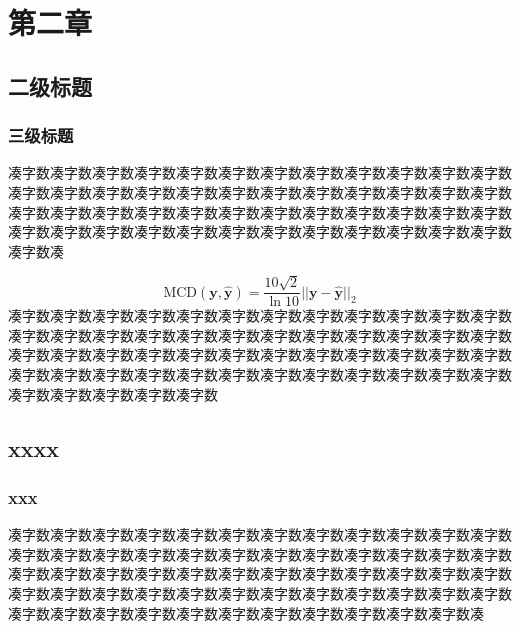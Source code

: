 \section{第二章}
\subsection{二级标题}
\subsubsection{三级标题}
凑字数凑字数凑字数凑字数凑字数凑字数凑字数凑字数凑字数凑字数凑字数凑字数凑字数凑字数凑字数凑字数凑字数凑字数凑字数凑字数凑字数凑字数凑字数凑字数凑字数凑字数凑字数凑字数凑字数凑字数凑字数凑字数凑字数凑字数凑字数凑字数凑字数凑字数凑字数凑字数凑字数凑字数凑字数凑字数凑字数凑字数凑字数凑字数凑字数凑\par
\begin{equation}
    \mathrm{MCD}(\boldsymbol{y},\boldsymbol{\hat{y}})=\frac{10\sqrt{2}}{\ln10}||\boldsymbol{y}-\boldsymbol{\hat{y}}||_2
\end{equation}
凑字数凑字数凑字数凑字数凑字数凑字数凑字数凑字数凑字数凑字数凑字数凑字数凑字数凑字数凑字数凑字数凑字数凑字数凑字数凑字数凑字数凑字数凑字数凑字数凑字数凑字数凑字数凑字数凑字数凑字数凑字数凑字数凑字数凑字数凑字数凑字数凑字数凑字数凑字数凑字数凑字数凑字数凑字数凑字数凑字数凑字数凑字数凑字数凑字数凑字数凑字数凑字数凑字数\par
\subsection{xxxx}
\subsubsection{xxx}
凑字数凑字数凑字数凑字数凑字数凑字数凑字数凑字数凑字数凑字数凑字数凑字数凑字数凑字数凑字数凑字数凑字数凑字数凑字数凑字数凑字数凑字数凑字数凑字数凑字数凑字数凑字数凑字数凑字数凑字数凑字数凑字数凑字数凑字数凑字数凑字数凑字数凑字数凑字数凑字数凑字数凑字数凑字数凑字数凑字数凑字数凑字数凑字数凑字数凑字数凑字数凑字数凑字数凑字数凑字数凑字数凑字数凑字数凑字数凑